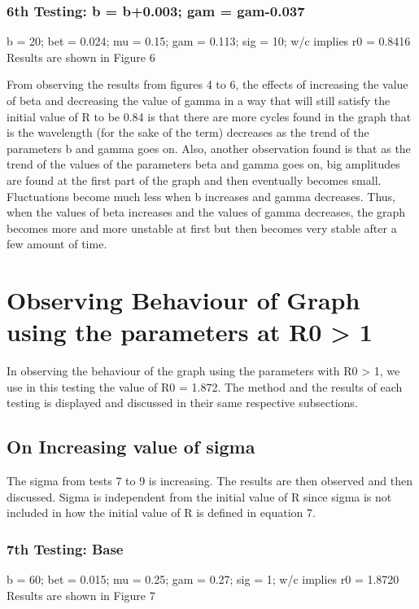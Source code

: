 \documentclass{acm_proc_article-sp}
\begin{document}
\subsubsection{6th Testing: b = b+0.003; gam = gam-0.037}
b = 20; bet = 0.024; mu = 0.15; gam = 0.113; sig = 10; w/c implies r0 = 0.8416\\
Results are shown in Figure 6

From observing the results from figures 4 to 6, the effects of increasing the value of beta and decreasing the value of gamma in a way that will still satisfy the initial value of R to be 0.84 is that there are more cycles found in the graph that is the wavelength (for the sake of the term) decreases as the trend of the parameters b and gamma goes on. Also, another observation found is that as the trend of the values of the parameters beta and gamma goes on, big amplitudes are found at the first part of the graph and then eventually becomes small. Fluctuations become much less when b increases and gamma decreases. Thus, when the values of beta increases and the values of gamma decreases, the graph becomes more and more unstable at first but then becomes very stable after a few amount of time.

\section{Observing Behaviour of Graph using the parameters at R0 > 1}
In observing the behaviour of the graph using the parameters with R0 > 1, we use in this testing the value of R0 = 1.872. The method and the results of each testing is displayed and discussed in their same respective subsections.

\subsection{On Increasing value of sigma}
The sigma from tests 7 to 9 is increasing. The results are then observed and then discussed. Sigma is independent from the initial value of R since sigma is not included in how the initial value of R is defined in equation 7.

\subsubsection{7th Testing: Base}
b = 60; bet = 0.015; mu = 0.25; gam = 0.27; sig = 1; w/c implies r0 = 1.8720\\
Results are shown in Figure 7
\end{document}
